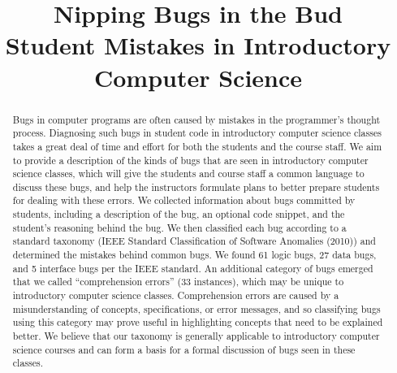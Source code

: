 \documentclass{sig-alternate}
\begin{document}
\title{Nipping Bugs in the Bud\\ Student Mistakes in Introductory Computer Science}
\author{
\alignauthor
}
\maketitle

\setcounter{page}{1}

\def\numlogicIEEE{64 }
\def\numdataIEEE{30 }
\def\numinterfaceIEEE{5 }
\def\numotherIEEE{27 }

\def\numlogic{61 }
\def\numdata{27 }
\def\numinterface{5 }
\def\numcomp{33 }
\def\numtotal{126 }
\def\numedge{31 }

\begin{abstract}
Bugs in computer programs are often caused by mistakes in the programmer's thought process. Diagnosing such bugs in student code in introductory computer science classes takes a great deal of time and effort for both the students and the course staff. We aim to provide a description of the kinds of bugs that are seen in introductory computer science classes, which will give the students and course staff a common language to discuss these bugs, and help the instructors formulate plans to better prepare students for dealing with these errors. We collected information about bugs committed by students, including a description of the bug, an optional code snippet, and the student's reasoning behind the bug. We then classified each bug according to a standard taxonomy (IEEE Standard Classification of Software Anomalies (2010)) and determined the mistakes behind common bugs. We found \numlogic logic bugs, \numdata data bugs, and \numinterface interface bugs per the IEEE standard. An additional category of bugs emerged that we called ``comprehension errors'' (\numcomp instances), which may be unique to introductory computer science classes. Comprehension errors are caused by a misunderstanding of concepts, specifications, or error messages, and so classifying bugs using this category may prove useful in highlighting concepts that need to be explained better. We believe that our taxonomy is generally applicable to introductory computer science courses and can form a basis for a formal discussion of bugs seen in these classes.

\end{abstract}
\end{document}
